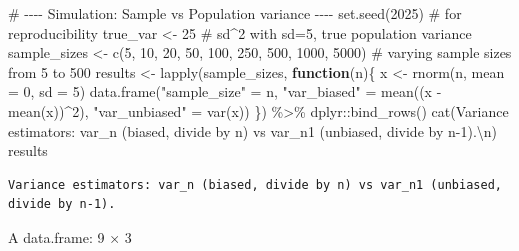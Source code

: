 \documentclass[
  12pt,
  letterpaper,
]{scrbook}
\newenvironment{Shaded}{\begin{snugshade}}{\end{snugshade}}
\newcommand{\AttributeTok}[1]{\textcolor[rgb]{0.40,0.45,0.13}{#1}}
\newcommand{\CommentTok}[1]{\textcolor[rgb]{0.37,0.37,0.37}{#1}}
\newcommand{\ControlFlowTok}[1]{\textcolor[rgb]{0.00,0.23,0.31}{\textbf{#1}}}
\newcommand{\DecValTok}[1]{\textcolor[rgb]{0.68,0.00,0.00}{#1}}
\newcommand{\FunctionTok}[1]{\textcolor[rgb]{0.28,0.35,0.67}{#1}}
\newcommand{\NormalTok}[1]{\textcolor[rgb]{0.00,0.23,0.31}{#1}}
\newcommand{\OtherTok}[1]{\textcolor[rgb]{0.00,0.23,0.31}{#1}}
\newcommand{\SpecialCharTok}[1]{\textcolor[rgb]{0.37,0.37,0.37}{#1}}
\newcommand{\StringTok}[1]{\textcolor[rgb]{0.13,0.47,0.30}{#1}}
\theoremstyle{definition}
\theoremstyle{plain}
\theoremstyle{remark}
\begin{document}
\begin{Shaded}
\begin{Highlighting}[]
\CommentTok{\# {-}{-}{-}{-} Simulation: Sample vs Population variance {-}{-}{-}{-}}
\FunctionTok{set.seed}\NormalTok{(}\DecValTok{2025}\NormalTok{)  }\CommentTok{\# for reproducibility}
\NormalTok{true\_var }\OtherTok{\textless{}{-}} \DecValTok{25}  \CommentTok{\# sd\^{}2 with sd=5, true population variance}
\NormalTok{sample\_sizes }\OtherTok{\textless{}{-}} \FunctionTok{c}\NormalTok{(}\DecValTok{5}\NormalTok{, }\DecValTok{10}\NormalTok{, }\DecValTok{20}\NormalTok{, }\DecValTok{50}\NormalTok{, }\DecValTok{100}\NormalTok{, }\DecValTok{250}\NormalTok{, }\DecValTok{500}\NormalTok{, }\DecValTok{1000}\NormalTok{, }\DecValTok{5000}\NormalTok{) }\CommentTok{\# varying sample sizes from 5 to 500}
\NormalTok{results }\OtherTok{\textless{}{-}} \FunctionTok{lapply}\NormalTok{(sample\_sizes, }\ControlFlowTok{function}\NormalTok{(n)\{}
\NormalTok{  x }\OtherTok{\textless{}{-}} \FunctionTok{rnorm}\NormalTok{(n, }\AttributeTok{mean =} \DecValTok{0}\NormalTok{, }\AttributeTok{sd =} \DecValTok{5}\NormalTok{)}
  \FunctionTok{data.frame}\NormalTok{(}\StringTok{"sample\_size"} \OtherTok{=}\NormalTok{ n, }\StringTok{"var\_biased"} \OtherTok{=} \FunctionTok{mean}\NormalTok{((x }\SpecialCharTok{{-}} \FunctionTok{mean}\NormalTok{(x))}\SpecialCharTok{\^{}}\DecValTok{2}\NormalTok{), }\StringTok{"var\_unbiased"} \OtherTok{=} \FunctionTok{var}\NormalTok{(x))}
\NormalTok{\}) }\SpecialCharTok{\%\textgreater{}\%}\NormalTok{ dplyr}\SpecialCharTok{::}\FunctionTok{bind\_rows}\NormalTok{()}
\FunctionTok{cat}\NormalTok{(}\StringTok{\textquotesingle{}Variance estimators: var\_n (biased, divide by n) vs var\_n1 (unbiased, divide by n{-}1).}\SpecialCharTok{\textbackslash{}n}\StringTok{\textquotesingle{}}\NormalTok{)}
\NormalTok{results}
\end{Highlighting}
\end{Shaded}

\begin{verbatim}
Variance estimators: var_n (biased, divide by n) vs var_n1 (unbiased, divide by n-1).
\end{verbatim}

A data.frame: 9 × 3
\end{document}
